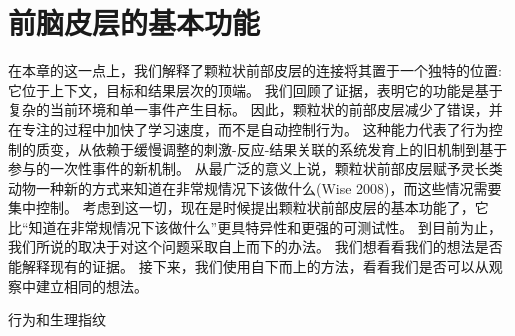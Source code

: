\section{前脑皮层的基本功能}

在本章的这一点上，我们解释了颗粒状前部皮层的连接将其置于一个独特的位置:它位于上下文，目标和结果层次的顶端。
我们回顾了证据，表明它的功能是基于复杂的当前环境和单一事件产生目标。
因此，颗粒状的前部皮层减少了错误，并在专注的过程中加快了学习速度，而不是自动控制行为。
这种能力代表了行为控制的质变，从依赖于缓慢调整的刺激-反应-结果关联的系统发育上的旧机制到基于参与的一次性事件的新机制。
从最广泛的意义上说，颗粒状前部皮层赋予灵长类动物一种新的方式来知道在非常规情况下该做什么(Wise 2008)，而这些情况需要集中控制。
考虑到这一切，现在是时候提出颗粒状前部皮层的基本功能了，它比“知道在非常规情况下该做什么”更具特异性和更强的可测试性。
到目前为止，我们所说的取决于对这个问题采取自上而下的办法。
我们想看看我们的想法是否能解释现有的证据。
接下来，我们使用自下而上的方法，看看我们是否可以从观察中建立相同的想法。



行为和生理指纹

